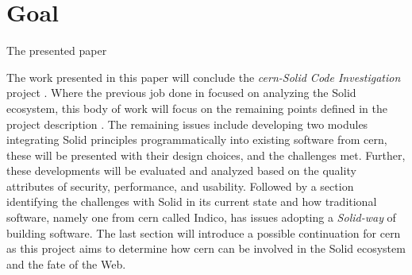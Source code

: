 \section{Goal}

The presented paper 

The work presented in this paper will conclude the \textit{\gls{cern}-Solid Code Investigation} project \cite{cern-solid-code-investigation-project-description}. Where the previous job done in \cite{cern-solid-investigation-spec} focused on analyzing the Solid ecosystem, this body of work will focus on the remaining points defined in the project description \cite{cern-solid-code-investigation-project-description}. The remaining issues include developing two modules integrating Solid principles programmatically into existing software from \gls{cern}, these will be presented with their design choices, and the challenges met. Further, these developments will be evaluated and analyzed based on the quality attributes of security, performance, and usability. Followed by a section identifying the challenges with Solid in its current state and how traditional software, namely one from \gls{cern} called Indico, has issues adopting a \textit{Solid-way} of building software. The last section will introduce a possible continuation for \gls{cern} as this project aims to determine how \gls{cern} can be involved in the Solid ecosystem and the fate of the Web.
